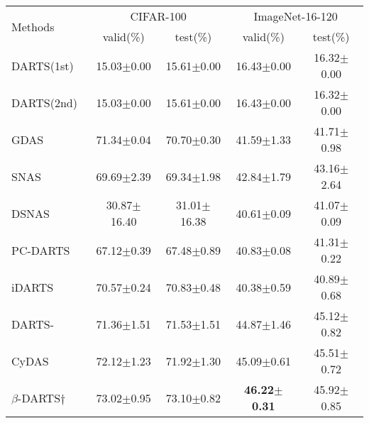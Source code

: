 \documentclass[10pt,twocolumn,letterpaper]{article}
\begin{document}
\begin{table}
\begin{center}
{\begin{tabular}{lcccc}
          \toprule
          \multirow{2}{*}{Methods}                              & \multicolumn{2}{c}{CIFAR-100}  & \multicolumn{2}{c}{ImageNet-16-120}\\
          \cmidrule(r){2-5}
                                                                           & valid(\%)           & test(\%)            & valid(\%)           & test(\%)         \\
          \midrule
          DARTS(1st)~\cite{liu2018darts}                                       & 15.03$\pm$0.00          & 15.61$\pm$0.00          & 16.43$\pm$0.00          & 16.32$\pm$0.00          \\
          DARTS(2nd)~\cite{liu2018darts}                                      & 15.03$\pm$0.00          & 15.61$\pm$0.00          & 16.43$\pm$0.00          & 16.32$\pm$0.00          \\
          GDAS~\cite{Dong_2019_gdas}                                          & 71.34$\pm$0.04          & 70.70$\pm$0.30          & 41.59$\pm$1.33          & 41.71$\pm$0.98          \\
          SNAS~\cite{xie2018snas}                                               & 69.69$\pm$2.39          & 69.34$\pm$1.98          & 42.84$\pm$1.79          & 43.16$\pm$2.64          \\
          DSNAS~\cite{Hu_2020_dsnas}                                             & 30.87$\pm$16.40         & 31.01$\pm$16.38         & 40.61$\pm$0.09          & 41.07$\pm$0.09          \\
          PC-DARTS~\cite{Xu2020PC-DARTS}                                       & 67.12$\pm$0.39          & 67.48$\pm$0.89          & 40.83$\pm$0.08          & 41.31$\pm$0.22          \\
          iDARTS~\cite{zhang21s_idarts}                                        & 70.57$\pm$0.24          & 70.83$\pm$0.48          & 40.38$\pm$0.59          & 40.89$\pm$0.68          \\
          DARTS-~\cite{chu2021dartsminus}                                     & 71.36$\pm$1.51          & 71.53$\pm$1.51          & 44.87$\pm$1.46          & 45.12$\pm$0.82          \\
          CyDAS~\cite{Yu_2022_cdarts}                                          & 72.12$\pm$1.23          & 71.92$\pm$1.30          & 45.09$\pm$0.61          & 45.51$\pm$0.72          \\
          $\beta$-DARTS$\dagger$~\cite{ye_2022_beta}                          & 73.02$\pm$0.95          & 73.10$\pm$0.82          & \textbf{46.22$\pm$0.31} & 45.92$\pm$0.85          \\

\end{tabular}}
\end{center}
\end{table}
\end{document}
